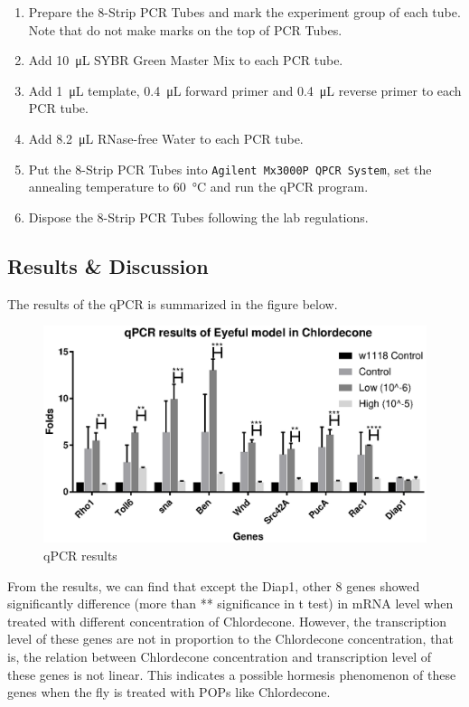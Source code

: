 		\begin{enumerate}
			\item Prepare the 8-Strip PCR Tubes and mark the experiment group of each tube. Note that do not make marks on the top of PCR Tubes.
			\item Add \SI{10}{\uL} SYBR Green Master Mix to each PCR tube.
			\item Add \SI{1}{\uL} template, \SI{0.4}{\uL} forward primer and \SI{0.4}{\uL} reverse primer to each PCR tube.
			\item Add \SI{8.2}{\uL} RNase-free Water to each PCR tube.
			\item Put the 8-Strip PCR Tubes into \texttt{Agilent Mx3000P QPCR System}, set the annealing temperature to \SI{60}{\celsius} and run the qPCR program.
			\item Dispose the 8-Strip PCR Tubes following the lab regulations.
		\end{enumerate}


\subsection{Results \& Discussion}

The results of the qPCR is summarized in the figure below.

\begin{figure}[H]
    \centering
    \includegraphics[width=1\textwidth,angle=0]{image/Data4.eps}
    \caption{qPCR results}
    \label{qpcr}
\end{figure}

From the results, we can find that except the Diap1, other 8 genes showed significantly difference (more than ** significance in t test) in mRNA level when treated with different concentration of Chlordecone. However, the transcription level of these genes are not in proportion to the Chlordecone concentration, that is, the relation between Chlordecone concentration and transcription level of these genes is not linear. This indicates a possible hormesis phenomenon of these genes when the fly is treated with POPs like Chlordecone. 

